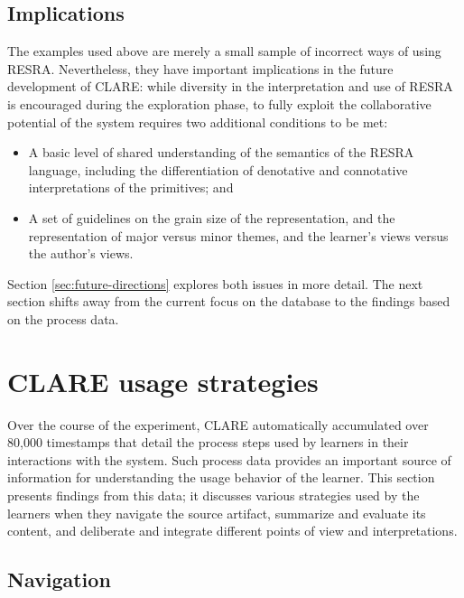\subsection{Implications}
\label{sec:implications}

The examples used above are merely a small sample of incorrect ways of
using RESRA. Nevertheless, they have important implications in the future
development of CLARE: while diversity in the interpretation and use of
RESRA is encouraged during the exploration phase, to fully exploit the
collaborative potential of the system requires two additional conditions to
be met:

\begin{itemize}
\item A basic level of shared understanding of the semantics of the RESRA
  language, including the differentiation of denotative and connotative
  interpretations of the primitives; and
  
\item A set of guidelines on the grain size of the representation, and
  the representation of major versus minor themes, and the learner's views
  versus the author's views.
\end{itemize}

Section \ref{sec:future-directions} explores both issues in more
detail. The next section shifts away from the current focus on the database
to the findings based on the process data.


\section{CLARE usage strategies}
\label{sec:strategies}

Over the course of the experiment, CLARE automatically accumulated over
80,000 timestamps that detail the process steps used by learners in their
interactions with the system. Such process data provides an important
source of information for understanding the usage behavior of the learner.
This section presents findings from this data; it discusses various
strategies used by the learners when they navigate the source artifact,
summarize and evaluate its content, and deliberate and integrate different
points of view and interpretations.

\subsection{Navigation}


